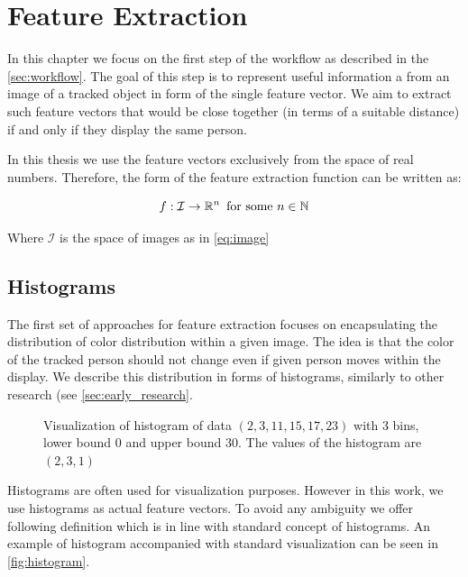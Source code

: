 \chapter{Feature Extraction}


\label{ch:features}

In this chapter we focus on the first step of the workflow as described in the
\autoref{sec:workflow}. The goal of this step is to represent useful
information a from an image of a tracked object in form of the single
feature vector. We aim to extract such feature vectors that would be close
together (in terms of a suitable distance) if and only if they display the
same person.

In this thesis we use the feature vectors exclusively from the space of
real numbers. Therefore, the form of the feature extraction function can
be written as:

$$f : \mathcal{I} \rightarrow \mathbb{R}^n \, \text{ for some } n \in \mathbb{N}$$

Where $\mathcal{I}$ is the space of images as in \autoref{eq:image}

\section{Histograms}

\label{sec:histograms}

The first set of approaches for feature extraction focuses on encapsulating the
distribution of color distribution within a given image. The idea is that the
color of the tracked person
should not change even if given person moves within the display. We describe
this distribution in forms of histograms, similarly to other research
(see \autoref{sec:early_research}.

\begin{figure}
    \centering
    \def\svgwidth{\columnwidth}
    \scalebox{0.6}{}
    \caption[Visualization of histogram of data]{Visualization of histogram of data $(2, 3, 11, 15, 17, 23)$ with 3 bins, lower bound 0 and upper bound 30. The values of the histogram are $(2, 3, 1)$}
    \label{fig:histogram}
\end{figure}

Histograms are often used for visualization purposes. However in this work, we
use histograms as actual feature vectors. To avoid
any ambiguity we offer following definition which is in line with standard
concept of histograms. An example of histogram accompanied with standard
visualization can be seen in \autoref{fig:histogram}.

